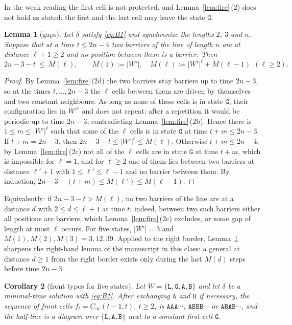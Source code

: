 \documentclass[11pt]{article}
\newtheorem{lemma}{Lemma}
\newtheorem{corollary}[lemma]{Corollary}
\theoremstyle{remark}
\newcommand{\Lq}{\mathtt{L}}\newcommand{\Gq}{\mathtt{G}}\newcommand{\Aq}{\mathtt{A}}\newcommand{\Bq}{\mathtt{B}}\newcommand{\Fq}{\mathtt{F}}
\begin{document}
In the weak reading the first cell is not protected, and Lemma~\ref{lem:fire}\,(2) does not hold as stated:
the first and the last cell may leave the state $\Gq$.

\begin{lemma}[gaps]\label{lem:gap}
Let $\delta$ satisfy \eqref{eq:B1} and synchronize the lengths $2$, $3$ and $n$. Suppose that at a time
$t\le 2n-4$ two barriers of the line of length $n$ are at distance $\ell+1\ge2$ and no position between them
is a barrier. Then
\[
2n-3-t\ \le\ M(\ell),\qquad M(1):=|W'|,\quad M(\ell):=|W'|^{\ell}+M(\ell-1)\ \ (\ell\ge2).
\]
\end{lemma}

\begin{proof}
By Lemma~\ref{lem:fire}\,(2d) the two barriers stay barriers up to time $2n-3$, so at the times $t,\dots,2n-3$
the $\ell$ cells between them are driven by themselves and two constant neighbours. As long as none of these
cells is in state $\Gq$, their configuration lies in $W'^{\ell}$ and does not repeat: after a repetition it
would be periodic up to time $2n-3$, contradicting Lemma~\ref{lem:fire}\,(2b). Hence there is
$1\le m\le|W'|^{\ell}$ such that some of the $\ell$ cells is in state $\Gq$ at time $t+m\le 2n-3$. If
$t+m=2n-3$, then $2n-3-t\le|W'|^{\ell}\le M(\ell)$. Otherwise $t+m\le 2n-4$; by
Lemma~\ref{lem:fire}\,(2c) not all of the $\ell$ cells are in state $\Gq$ at time $t+m$, which is impossible
for $\ell=1$, and for $\ell\ge2$ one of them lies between two barriers at distance $\ell'+1$ with
$1\le\ell'\le\ell-1$ and no barrier between them. By induction, $2n-3-(t+m)\le M(\ell')\le M(\ell-1)$.
\end{proof}

Equivalently: if $2n-3-t>M(\ell)$, no two barriers of the line are at a distance $d$ with $2\le d\le\ell+1$ at
time $t$; indeed, between two such barriers either all positions are barriers, which
Lemma~\ref{lem:fire}\,(2c) excludes, or some gap of length at most $\ell$ occurs. For five states, $|W'|=3$ and
$M(1),M(2),M(3)=3,12,39$. Applied to the right border, Lemma~\ref{lem:gap} sharpens the right-band lemma of the
manuscript in this class: a general at distance $d\ge1$ from the right border exists only during the last
$M(d)$ steps before time $2n-3$.

\begin{corollary}[front types for five states]\label{cor:front}
Let $W=\{\Lq,\Gq,\Aq,\Bq\}$ and let $\delta$ be a minimal-time solution with \eqref{eq:B1}. After exchanging
$\Aq$ and $\Bq$ if necessary, the sequence of front cells $f_t=C_\infty(t-1,t)$, $t\ge2$, is
$\Aq\Aq\Aq\cdots$, $\Aq\Bq\Bq\Bq\cdots$ or $\Aq\Bq\Aq\Bq\cdots$, and the half-line is a diagram over
$\{\Lq,\Aq,\Bq\}$ next to a constant first cell $\Gq$.
\end{corollary}
\end{document}

